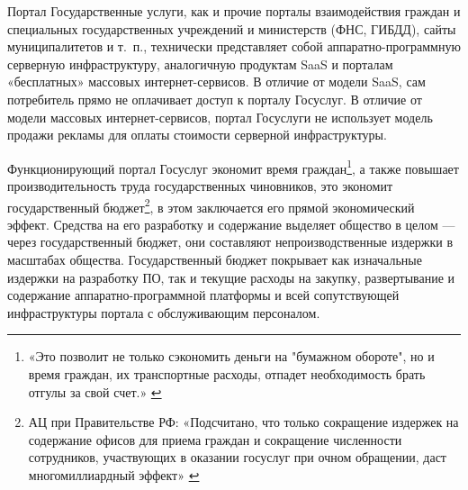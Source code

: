 \documentclass{article}
\begin{document}
Портал Государственные услуги, как и прочие порталы взаимодействия граждан и специальных государственных учреждений и министерств (ФНС, ГИБДД), сайты муниципалитетов и т.~п., технически представляет собой аппаратно-программную серверную инфраструктуру, аналогичную продуктам SaaS и порталам «бесплатных» массовых интернет-сервисов. В отличие от модели SaaS, сам потребитель прямо не оплачивает доступ к порталу Госуслуг. В отличие от модели массовых интернет-сервисов, портал Госуслуги не использует модель продажи рекламы для оплаты стоимости серверной инфраструктуры.

Функционирующий портал Госуслуг экономит время граждан\footnote{«Это позволит не только сэкономить деньги на "бумажном обороте", но и время граждан, их транспортные расходы, отпадет необходимость брать отгулы за свой счет.» \cite{gosuslugiLaunch2009}}, а также повышает производительность труда государственных чиновников, это экономит государственный бюджет\footnote{АЦ при Правительстве РФ: «Подсчитано, что только сокращение издержек на содержание офисов для приема граждан и сокращение численности сотрудников, участвующих в оказании госуслуг при очном обращении, даст многомиллиардный эффект» \cite{gosuslugiCutExpenses2021}}, в этом заключается его прямой экономический эффект. Средства на его разработку и содержание выделяет общество в целом — через государственный бюджет, они составляют непроизводственные издержки в масштабах общества. Государственный бюджет покрывает как изначальные издержки на разработку ПО, так и текущие расходы на закупку, развертывание и содержание аппаратно-программной платформы и всей сопутствующей инфраструктуры портала с обслуживающим персоналом.
\end{document}
